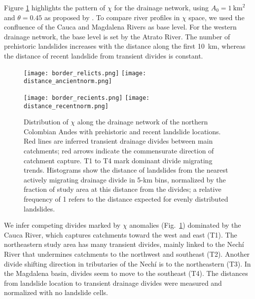 \documentclass[draft]{agujournal2019}
\begin{document}
\par Figure \ref{fig:rel-rec} highlights the pattern of $\chi$ for the drainage network, using $A_0=1~\mathrm{km}^2$ and $\theta=0.45$ as proposed by . To compare river profiles in $\chi$ space, we used the confluence of the Cauca and Magdalena Rivers as base level. For the western drainage network, the base level is set by the Atrato River. The number of prehistoric landslides increases with the distance along the first 10~km, whereas the distance of recent landslide from transient divides is constant.

\begin{figure}[ht!]
  \begin{minipage}{.48\linewidth}
    \centering
      {\texttt{[image: border\_relicts.png]}}
      {\texttt{[image: distance\_ancientnorm.png]}}
  \end{minipage}\quad
  \begin{minipage}{.48\linewidth}
    \centering
      {\texttt{[image: border\_recients.png]}}
      {\texttt{[image: distance\_recentnorm.png]}}
  \end{minipage}
    \caption{Distribution of $\chi$ along the drainage network of the northern Colombian Andes with prehistoric and recent landslide locations. Red lines are inferred transient drainage divides between main catchments; red arrows indicate the commensurate direction of catchment capture. T1 to T4 mark dominant divide migrating trends. Histograms show the distance of landslides from the nearest actively migrating drainage divide in 5-km bins, normalized by the fraction of study area at this distance from the divides; a relative frequency of 1 refers to the distance expected for evenly distributed landslides.}
    \label{fig:rel-rec}
\end{figure}

\par We infer competing divides marked by $\chi$ anomalies (Fig.~\ref{fig:rel-rec}) dominated by the Cauca River, which captures catchments toward the west and east (T1). The northeastern study area has many transient divides, mainly linked to the Nechí River that undermines catchments to the northwest and southeast (T2). Another divide shifting direction in tributaries of the Nechí is to the northeastern (T3). In the Magdalena basin, divides seem to move to the southeast (T4). The distances from landslide location to transient drainage divides were measured and normalized with no landslide cells.
\end{document}
